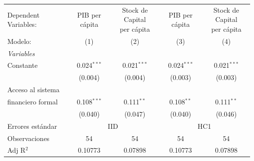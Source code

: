 \begingroup
\centering
\begin{tabular}{lcccc}
   \tabularnewline \midrule \midrule
   Dependent Variables:                     & PIB per cápita & \makecell{Stock de Capital \\per cápita}    & PIB per cápita & \makecell{Stock de Capital \\per cápita}\\     
   Modelo:                                   & (1)            & (2)                                         & (3)            & (4)\\  
   \midrule
   \emph{Variables}\\
   Constante                                 & 0.024$^{***}$  & 0.021$^{***}$                               & 0.024$^{***}$  & 0.021$^{***}$\\   
                                            & (0.004)        & (0.004)                                     & (0.003)        & (0.003)\\   
   Acceso al sistema \\ financiero formal   & 0.108$^{***}$  & 0.111$^{**}$                                & 0.108$^{**}$   & 0.111$^{**}$\\   
                                            & (0.040)        & (0.047)                                     & (0.040)        & (0.046)\\   
   \midrule
   \midrule
   Errores estándar & \multicolumn{2}{c}{IID} & \multicolumn{2}{c}{HC1} \\ 
   Observaciones                             & 54             & 54                                          & 54             & 54\\  
   Adj R$^2$                           & 0.10773        & 0.07898                                     & 0.10773        & 0.07898\\  
   \midrule \midrule
\end{tabular}
\par\endgroup
